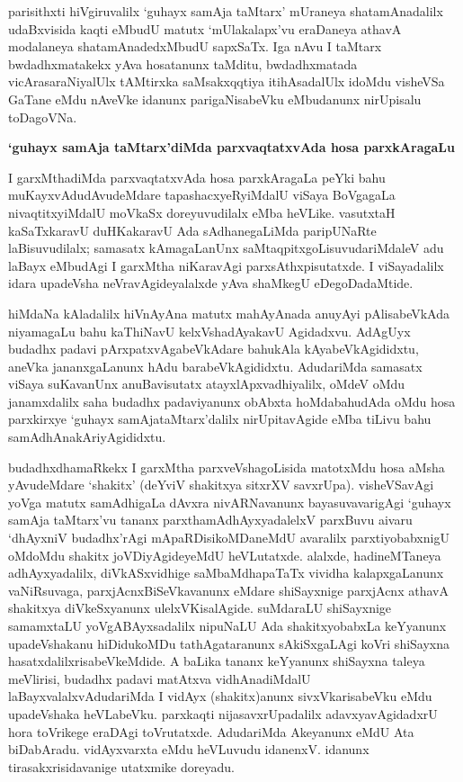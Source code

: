 parisithxti hiVgiruvalilx `guhayx samAja taMtarx' mUraneya shatamAnadalilx udaBxvisida kaqti eMbudU matutx `mUlakalapx'vu eraDaneya athavA modalaneya shatamAna\-dedxMbudU sapxSaTx. Iga nAvu I taMtarx bwdadhxmatakekx yAva hosatanunx taMditu, bwdadhxmatada vicArasaraNiyalUlx tAMtirxka saMsakxqqtiya itihAsadalUlx idoMdu visheVSa GaTane eMdu nAveVke idanunx parigaNisabeVku eMbudanunx nirUpisalu toDagoVNa. 

\begin{center}
{\Large\bf `guhayx samAja taMtarx'diMda parxvaqtatxvAda hosa parxkAragaLu}
\end{center}

I garxMthadiMda parxvaqtatxvAda hosa parxkAragaLa peYki bahu muKayxvAdudAvudeMdare tapashacxyeRyiMdalU viSaya BoVgagaLa nivaqtitxyiMdalU moVkaSx doreyuvudilalx eMba heVLike. vasutxtaH kaSaTxkaravU duHKakaravU Ada sAdhanegaLiMda paripUNaRte laBisuvudilalx; samasatx kAmagaLanUnx saMtaqpitxgoLisuvudariMdaleV adu laBayx eMbudAgi I garxMtha niKaravAgi parxsAthxpisutatxde. I viSayadalilx idara upadeVsha neVravAgideyalalxde yAva shaMkegU eDegoDadaMtide.

hiMdaNa kAladalilx hiVnAyAna matutx mahAyAnada anuyAyi pAlisa\-beVkAda niyamagaLu bahu kaThiNavU kelxVshadAyakavU Agidadxvu. AdAgUyx budadhx padavi pArxpatxvAgabeVkAdare bahukAla kAyabeVkAgididxtu, aneVka jananxgaLanunx hAdu barabeVkAgididxtu. AdudariMda samasatx viSaya suKavanUnx anuBavisutatx atayxlApxvadhiyalilx, oMdeV oMdu janamxdalilx saha budadhx padaviyanunx obAbxta hoMdabahudAda oMdu hosa parxkirxye `guhayx samAjataMtarx'dalilx nirUpitavAgide eMba tiLivu bahu samAdhAnakAriyAgididxtu.

budadhxdhamaRkekx I garxMtha parxveVshagoLisida matotxMdu hosa aMsha yAvu\-deMdare `shakitx' (deYviV shakitxya sitxrXV savxrUpa). visheVSavAgi yoVga matutx samAdhigaLa dAvxra nivARNavanunx bayasuvavarigAgi `guhayx samAja taMtarx'vu tananx parxthamAdhAyxyadalelxV parxBuvu aivaru `dhAyxniV budadhx'rAgi mApaRDisikoMDaneMdU avaralilx parxtiyobabxnigU oMdoMdu shakitx joVDiyAgideyeMdU heVLutatxde. alalxde, hadineMTaneya adhAyxyadalilx, diVkASxvidhige saMbaMdhapaTaTx vividha kalapxgaLanunx vaNiRsuvaga, parxjAcnxBiSeVkavanunx eMdare shiSayxnige parxjAcnx athavA shakitxya diVkeSxyanunx ulelxVKisalAgide. suMdaraLU shiSayxnige samamxtaLU yoVgABAyxsadalilx nipuNaLU Ada shakitxyobabxLa keYyanunx upadeVshakanu hiDidukoMDu tathAgataranunx sAkiSxgaLAgi koVri shiSayxna hasatxdalilxrisabeVkeMdide. A baLika tananx keYyanunx shiSayxna taleya meVlirisi, budadhx padavi matAtxva vidhAnadiMdalU laBayxvalalxvAdudariMda I vidAyx (shakitx)anunx sivxVkarisabeVku eMdu upadeVshaka heVLabeVku. parxkaqti nijasavxrUpadalilx adavxyavAgidadxrU hora toVrikege eraDAgi toVrutatxde. AdudariMda Akeyanunx eMdU Ata biDabAradu. vidAyxvarxta eMdu heVLuvudu idanenxV. idanunx tirasakxrisidavanige utatxmike doreyadu.

